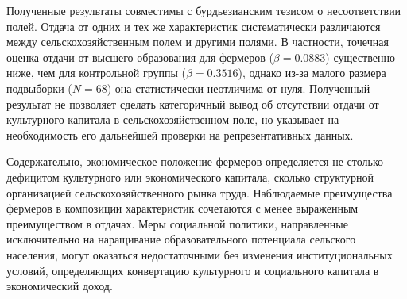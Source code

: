 \documentclass[14pt, a4paper]{article}
\begin{document}
	Полученные результаты совместимы с бурдьезианским тезисом о несоответствии полей. Отдача от одних и тех же характеристик систематически различаются между сельскохозяйственным полем и другими полями. В частности, точечная оценка отдачи от высшего образования для фермеров (\(\beta = 0.0883\)) существенно ниже, чем для контрольной группы (\(\beta = 0.3516\)), однако из-за малого размера подвыборки (\(N = 68\)) она статистически неотличима от нуля. Полученный результат не позволяет сделать категоричный вывод об отсутствии отдачи от культурного капитала в сельскохозяйственном поле, но указывает на необходимость его дальнейшей проверки на репрезентативных данных.
	
	Содержательно, экономическое положение фермеров определяется не столько дефицитом культурного или экономического капитала, сколько структурной организацией сельскохозяйственного рынка труда. Наблюдаемые преимущества фермеров в композиции характеристик сочетаются с менее выраженным преимуществом в отдачах. Меры социальной политики, направленные исключительно на наращивание образовательного потенциала сельского населения, могут оказаться недостаточными без изменения институциональных условий, определяющих конвертацию культурного и социального капитала в экономический доход.
	
\end{document}
